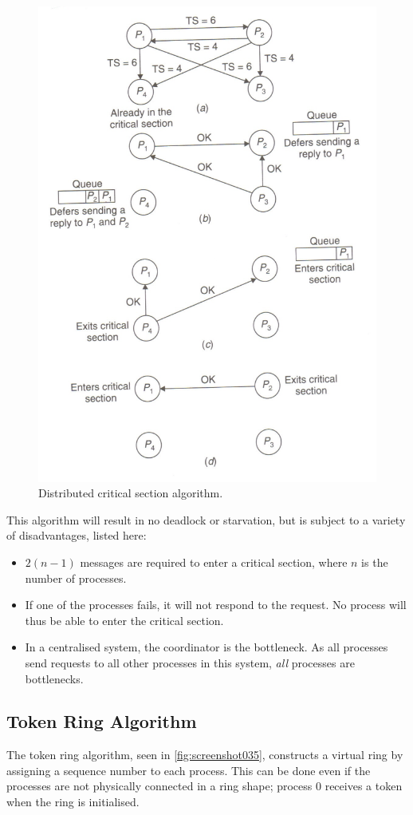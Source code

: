 \begin{figure}
\centering
\includegraphics[width=0.7\linewidth]{figures/screenshot034}
\caption{Distributed critical section algorithm.}
\label{fig:screenshot034}
\end{figure}

This algorithm will result in no deadlock or starvation, but is subject to a variety of disadvantages, listed here: \begin{itemize}
\item $2(n - 1)$ messages are required to enter a critical section, where $n$ is the number of processes.
\item If one of the processes fails, it will not respond to the request. No process will thus be able to enter the critical section.
\item In a centralised system, the coordinator is the bottleneck. As all processes send requests to all other processes in this system, \textit{all} processes are bottlenecks.
\end{itemize}

\subsection{Token Ring Algorithm}
The token ring algorithm, seen in \autoref{fig:screenshot035}, constructs a virtual ring by assigning a sequence number to each process. This can be done even if the processes are not physically connected in a ring shape; process $0$ receives a token when the ring is initialised.


